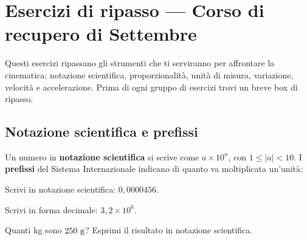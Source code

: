 \documentclass[11pt]{report}
\begin{document}
\newcommand{\blank}[1][2.2cm]{\underline{\hspace{#1}}}
\chapter{Esercizi di ripasso — Corso di recupero di Settembre}

Questi esercizi ripassano gli strumenti che ti serviranno per affrontare la cinematica: notazione scientifica, proporzionalità, unità di misura, variazione, velocità e accelerazione. Prima di ogni gruppo di esercizi trovi un breve box di ripasso.

\section{Notazione scientifica e prefissi}

\begin{mdframed}
Un numero in \textbf{notazione scientifica} si scrive come $a\times10^{n}$, con $1\le |a| <10$. I \textbf{prefissi} del Sistema Internazionale indicano di quanto va moltiplicata un'unità:
\begin{center}
\end{center}
\end{mdframed}

\begin{exercise}[\onestar]
Scrivi in notazione scientifica: $0{,}0000456$.
\end{exercise}

\begin{exercise}[\onestar]
Scrivi in forma decimale: $3{,}2\times10^{6}$.
\end{exercise}

\begin{exercise}[\onestar]
Quanti kg sono $250\ \text g$? Esprimi il risultato in notazione scientifica.
\end{exercise}
\end{document}
